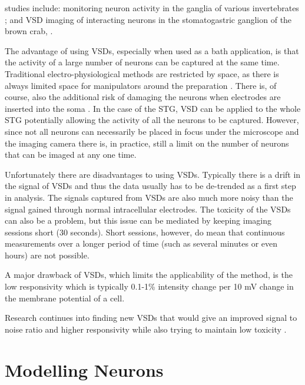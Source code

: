  studies include: monitoring neuron activity in the ganglia of various invertebrates \cite{Grinvald1981}; and \ac{VSD} imaging of interacting neurons in the stomatogastric ganglion of the brown crab, .

The advantage of using \acp{VSD}, especially when used as a bath application, is that the activity of a large number of neurons can be captured at the same time. Traditional electro-physiological methods are restricted by space, as there is always limited space for manipulators around the preparation \cite{Preuss2013}. There is, of course, also the additional risk of damaging the neurons when electrodes are inserted into the soma \cite{Ebner1995}. In the case of the \ac{STG}, \ac{VSD} can be applied to the whole \ac{STG} potentially allowing the activity of all the neurons to be captured. However, since not all neurons can necessarily be placed in focus under the microscope and the imaging camera there is, in practice, still a limit on the number of neurons that can be imaged at any one time. 

Unfortunately there are disadvantages to using \acp{VSD}. Typically there is a drift in the signal of \acp{VSD} and thus the data usually has to be de-trended as a first step in analysis. The signals captured from \acp{VSD} are also much more noisy than the signal gained through normal intracellular electrodes. The toxicity of the \acp{VSD} can also be a problem, but this issue can be mediated by keeping imaging sessions short (30 seconds). Short sessions, however, do mean that continuous measurements over a longer period of time (such as several minutes or even hours) are not possible.

A major drawback of \acp{VSD}, which limits the applicability of the method, is the low responsivity which is typically 0.1-1\% intensity change per 10 mV change in the membrane potential of a cell.

Research continues into finding new \acp{VSD} that would give an improved signal to noise ratio and higher responsivity while also trying to maintain low toxicity \cite{Bai2014}.


\section{Modelling Neurons}

